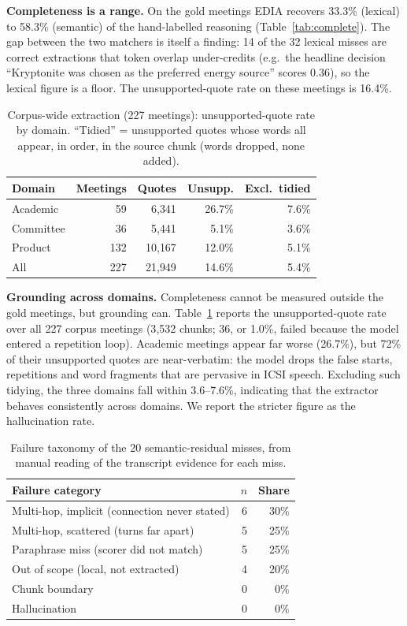 \documentclass[conference]{IEEEtran}
\begin{document}
\textbf{Completeness is a range.} On the gold meetings EDIA recovers 33.3\%
(lexical) to 58.3\% (semantic) of the hand-labelled reasoning
(Table~\ref{tab:complete}). The gap between the two matchers is itself a
finding: 14 of the 32 lexical misses are correct extractions that token overlap
under-credits (e.g.\ the headline decision ``Kryptonite was chosen as the
preferred energy source'' scores 0.36), so the lexical figure is a floor. The
unsupported-quote rate on these meetings is 16.4\%.

\begin{table}[t]
\caption{Corpus-wide extraction (227 meetings): unsupported-quote rate by domain.
``Tidied'' = unsupported quotes whose words all appear, in order, in the source
chunk (words dropped, none added).}
\label{tab:corpus}
\centering
\small
\begin{tabular}{@{}lrrrr@{}}
\toprule
Domain & Meetings & Quotes & Unsupp. & Excl.\ tidied \\
\midrule
Academic & 59 & 6{,}341 & 26.7\% & 7.6\% \\
Committee & 36 & 5{,}441 & 5.1\% & 3.6\% \\
Product & 132 & 10{,}167 & 12.0\% & 5.1\% \\
\midrule
All & 227 & 21{,}949 & 14.6\% & 5.4\% \\
\bottomrule
\end{tabular}
\end{table}

\textbf{Grounding across domains.} Completeness cannot be measured outside the
gold meetings, but grounding can. Table~\ref{tab:corpus} reports the
unsupported-quote rate over all 227 corpus meetings (3{,}532 chunks; 36, or 1.0\%,
failed because the model entered a repetition loop). Academic meetings appear
far worse (26.7\%), but 72\% of their unsupported quotes are near-verbatim: the
model drops the false starts, repetitions and word fragments that are pervasive
in ICSI speech. Excluding such tidying, the three domains fall within
3.6--7.6\%, indicating that the extractor behaves consistently across domains.
We report the stricter figure as the hallucination rate.

\begin{table}[t]
\caption{Failure taxonomy of the 20 semantic-residual misses, from manual reading
of the transcript evidence for each miss.}
\label{tab:taxonomy}
\centering
\small
\begin{tabular}{@{}lrr@{}}
\toprule
Failure category & $n$ & Share \\
\midrule
Multi-hop, implicit (connection never stated) & 6 & 30\% \\
Multi-hop, scattered (turns far apart) & 5 & 25\% \\
Paraphrase miss (scorer did not match) & 5 & 25\% \\
Out of scope (local, not extracted) & 4 & 20\% \\
Chunk boundary & 0 & 0\% \\
Hallucination & 0 & 0\% \\
\bottomrule
\end{tabular}
\end{table}
\end{document}
